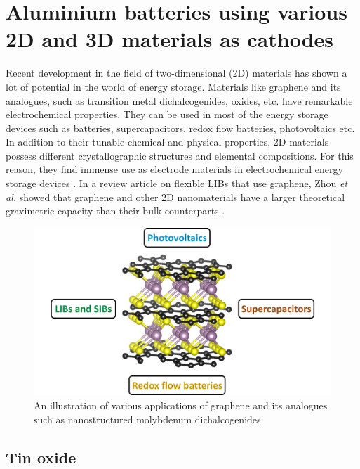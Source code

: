 \chapter{Aluminium batteries using various 2D and 3D materials as cathodes} 
\label{chap6} 
Recent development in the field of two-dimensional (2D) materials has shown a lot of potential in the world of energy storage. Materials like graphene and its analogues, such as transition metal dichalcogenides, oxides, etc. have remarkable electrochemical properties. They can be used in most of the energy storage devices such as batteries, supercapacitors, redox flow batteries, photovoltaics etc. In addition to their tunable chemical and physical properties, 2D materials possess different crystallographic structures and elemental compositions. For this reason, they find immense use as electrode materials in electrochemical energy storage devices \cite{wang_graphene_2009, bonaccorso_graphene_2015}. In a review article on flexible LIBs that use graphene, Zhou \textit{et al.} showed that graphene and other 2D nanomaterials have a larger theoretical gravimetric capacity than their bulk counterparts \cite{zhou_progress_2014}. \\

\begin{figure}[h!]
  \centering
  \includegraphics[width=\textwidth]{Figures/chap6fig/nanoTMDintro.pdf}
    \caption{An illustration of various applications of graphene and its analogues such as nanostructured molybdenum dichalcogenides.}
  \label{Figures/chap6fig:nanoTMDintro}
\end{figure}

\section{Tin oxide}

